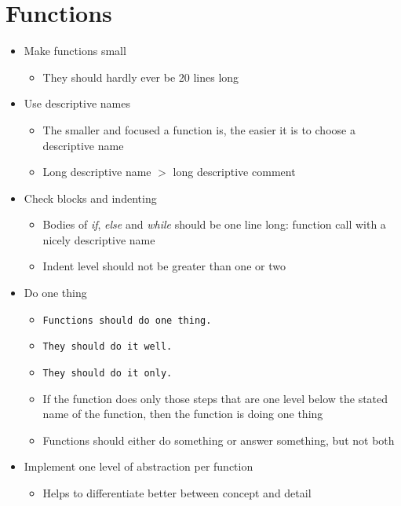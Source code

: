 
\section*{Functions}
\begin{itemize}
    \item Make functions small
    \begin{itemize}
        \item They should hardly ever be 20 lines long
    \end{itemize}
    \item Use descriptive names
    \begin{itemize}
        \item The smaller and focused a function is, the easier it is to choose a descriptive name
        \item Long descriptive name $>$ long descriptive comment
    \end{itemize}
    \item Check blocks and indenting
    \begin{itemize}
        \item Bodies of \textit{if}, \textit{else} and \textit{while} should be one line long:
        function call with a nicely descriptive name
        \item Indent level should not be greater than one or two
    \end{itemize}
    \item Do one thing
    \begin{itemize}
        \item \texttt{Functions should do one thing.}
        \item [] \texttt{They should do it well.}
        \item [] \texttt{They should do it only.}
        \item If the function does only those steps that are one level below the stated name of the function,
        then the function is doing one thing
        \item Functions should either do something or answer something, but not both
    \end{itemize}
    \item Implement one level of abstraction per function
    \begin{itemize}
        \item Helps to differentiate better between concept and detail
    \end{itemize}

\end{itemize}
